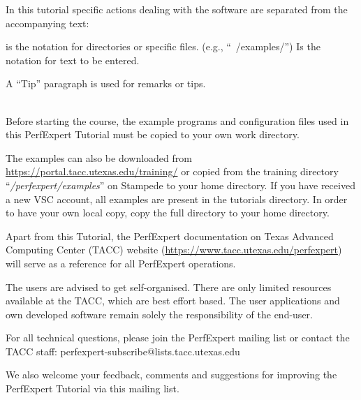 
In this tutorial specific actions dealing with the software are separated from the accompanying text:

\begin{prompt}
\end{prompt}

 is the notation for directories or specific files. (e.g., ``~/examples/'')
 Is the notation for text to be entered.

\begin{tip}
A ``Tip'' paragraph is used for remarks or tips.
\end{tip}

 \\

Before starting the course, the example programs and configuration files used in this PerfExpert Tutorial must be copied to your own work directory.

\iftacc
The examples can also be downloaded from \url{https://portal.tacc.utexas.edu/training/} or copied from the training directory  ``\emph{\tutorialdir/perfexpert/examples}'' on Stampede to your home directory.
\fi
\ifvsc
If you have received a new VSC account, all examples are present in the tutorials directory. In order to have your own local copy, copy the full directory to your home directory.
\fi

\begin{prompt}
\end{prompt}

Apart from this Tutorial, the PerfExpert documentation on Texas Advanced Computing Center (TACC) website (\url{https://www.tacc.utexas.edu/perfexpert}) will serve as a reference for all PerfExpert operations.

\begin{tip}
The users are advised to get self-organised. There are only limited resources available at the TACC, which are best effort based. The user applications and own developed software remain solely the responsibility of the end-user.
\end{tip}



For all technical questions, please join the PerfExpert mailing list or contact the TACC staff: perfexpert-subscribe@lists.tacc.utexas.edu

We also welcome your feedback, comments and suggestions for improving the PerfExpert Tutorial via this mailing list.
